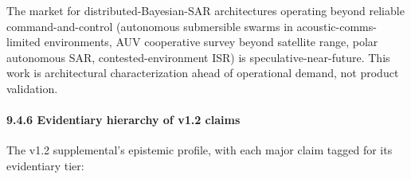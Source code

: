The market for distributed-Bayesian-SAR architectures operating beyond
reliable command-and-control (autonomous submersible swarms in
acoustic-comms-limited environments, AUV cooperative survey beyond
satellite range, polar autonomous SAR, contested-environment ISR) is
speculative-near-future. This work is architectural characterization
ahead of operational demand, not product validation.

\paragraph{9.4.6 Evidentiary hierarchy of v1.2
claims}\label{evidentiary-hierarchy-of-v1.2-claims}

The v1.2 supplemental's epistemic profile, with each major claim tagged
for its evidentiary tier:

